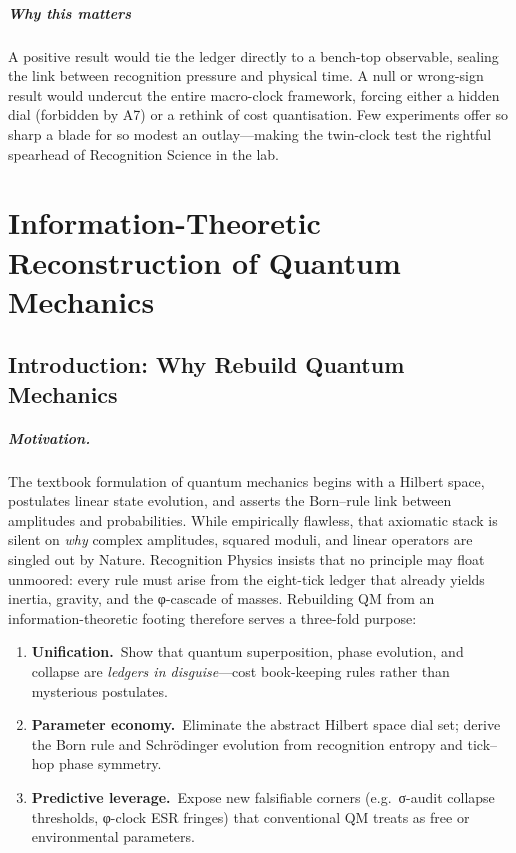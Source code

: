 \documentclass[11pt,oneside]{book}
\begin{document}
\paragraph*{Why this matters}

A positive result would tie the ledger directly to a bench-top observable, sealing the link between recognition pressure and physical time.  A null or wrong-sign result would undercut the entire macro-clock framework, forcing either a hidden dial (forbidden by A7) or a rethink of cost quantisation.  Few experiments offer so sharp a blade for so modest an outlay—making the twin-clock test the rightful spearhead of Recognition Science in the lab.





\chapter{Information-Theoretic Reconstruction of Quantum Mechanics}
\label{chap:info-qm}

\section{Introduction: Why Rebuild Quantum Mechanics}
\label{sec:qm-intro}

\paragraph*{Motivation.}
The textbook formulation of quantum mechanics begins with a Hilbert space,
postulates linear state evolution, and asserts the Born–rule link between
amplitudes and probabilities.  
While empirically flawless, that axiomatic stack is silent on \emph{why}
complex amplitudes, squared moduli, and linear operators are singled out
by Nature.  Recognition Physics insists that no principle may float
unmoored: every rule must arise from the eight-tick ledger that already
yields inertia, gravity, and the φ-cascade of masses.  
Rebuilding QM from an information-theoretic footing therefore serves a
three-fold purpose:

\begin{enumerate}
   \item \textbf{Unification.} Show that quantum superposition, phase
         evolution, and collapse are \emph{ledgers in disguise}—cost
         book-keeping rules rather than mysterious postulates.
   \item \textbf{Parameter economy.} Eliminate the abstract Hilbert
         space dial set; derive the Born rule and Schrödinger evolution
         from recognition entropy and tick–hop phase symmetry.
   \item \textbf{Predictive leverage.} Expose new falsifiable corners
         (e.g.\ σ-audit collapse thresholds, φ-clock ESR fringes) that
         conventional QM treats as free or environmental parameters.
\end{enumerate}
\end{document}
